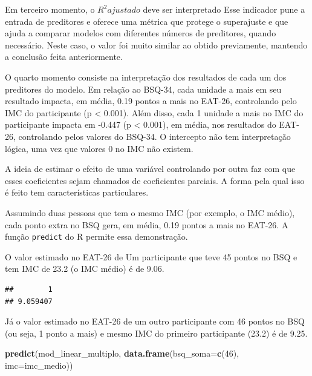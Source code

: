 \documentclass[
]{book}
\newenvironment{Shaded}{\begin{snugshade}}{\end{snugshade}}
\newcommand{\DataTypeTok}[1]{\textcolor[rgb]{0.13,0.29,0.53}{#1}}
\newcommand{\DecValTok}[1]{\textcolor[rgb]{0.00,0.00,0.81}{#1}}
\newcommand{\KeywordTok}[1]{\textcolor[rgb]{0.13,0.29,0.53}{\textbf{#1}}}
\newcommand{\NormalTok}[1]{#1}
\newcommand{\OperatorTok}[1]{\textcolor[rgb]{0.81,0.36,0.00}{\textbf{#1}}}
\newcommand{\StringTok}[1]{\textcolor[rgb]{0.31,0.60,0.02}{#1}}
\begin{document}
Em terceiro momento, o \(R^2 ajustado\) deve ser interpretado Esse
indicador pune a entrada de preditores e oferece uma métrica que protege
o superajuste e que ajuda a comparar modelos com diferentes números de
preditores, quando necessário. Neste caso, o valor foi muito similar ao
obtido previamente, mantendo a conclusão feita anteriormente.

O quarto momento consiste na interpretação dos resultados de cada um dos
preditores do modelo. Em relação ao BSQ-34, cada unidade a mais em seu
resultado impacta, em média, 0.19 pontos a mais no EAT-26, controlando
pelo IMC do participante (p \textless{} 0.001). Além disso, cada 1
unidade a mais no IMC do participante impacta em -0.447 (p \textless{}
0.001), em média, nos resultados do EAT-26, controlando pelos valores do
BSQ-34. O intercepto não tem interpretação lógica, uma vez que valores 0
no IMC não existem.

A ideia de estimar o efeito de uma variável controlando por outra faz
com que esses coeficientes sejam chamados de coeficientes parciais. A
forma pela qual isso é feito tem características particulares.

Assumindo duas pessoas que tem o mesmo IMC (por exemplo, o IMC médio),
cada ponto extra no BSQ gera, em média, 0.19 pontos a mais no EAT-26. A
função \texttt{predict} do R permite essa demonstração.

O valor estimado no EAT-26 de Um participante que teve 45 pontos no BSQ
e tem IMC de 23.2 (o IMC médio) é de 9.06.

\begin{Shaded}
\end{Shaded}

\begin{verbatim}
##        1 
## 9.059407
\end{verbatim}

Já o valor estimado no EAT-26 de um outro participante com 46 pontos no
BSQ (ou seja, 1 ponto a mais) e mesmo IMC do primeiro participante
(23.2) é de 9.25.

\begin{Shaded}
\begin{Highlighting}[]
\KeywordTok{predict}\NormalTok{(mod_linear_multiplo, }\KeywordTok{data.frame}\NormalTok{(}\DataTypeTok{bsq_soma=}\KeywordTok{c}\NormalTok{(}\DecValTok{46}\NormalTok{), }\DataTypeTok{imc=}\NormalTok{imc_medio))}
\end{Highlighting}
\end{Shaded}
\end{document}
